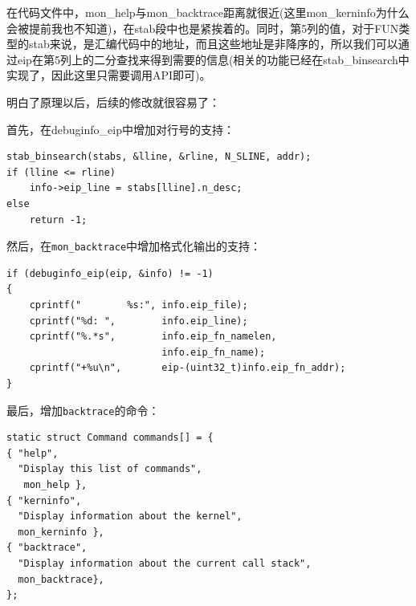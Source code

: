 在代码文件中，mon\_help与mon\_backtrace距离就很近(这里mon\_kerninfo为什么会被提前我也不知道)，在stab段中也是紧挨着的。同时，第5列的值，对于FUN类型的stab来说，是汇编代码中的地址，而且这些地址是非降序的，所以我们可以通过eip在第5列上的二分查找来得到需要的信息(相关的功能已经在stab\_binsearch中实现了，因此这里只需要调用API即可)。

明白了原理以后，后续的修改就很容易了：

首先，在debuginfo\_eip中增加对行号的支持：\\
\begin{lstlisting}
stab_binsearch(stabs, &lline, &rline, N_SLINE, addr);
if (lline <= rline)
    info->eip_line = stabs[lline].n_desc;
else
    return -1;
\end{lstlisting}

然后，在\lstinline{mon_backtrace}中增加格式化输出的支持：\\
\begin{lstlisting}
if (debuginfo_eip(eip, &info) != -1)
{
    cprintf("        %s:", info.eip_file);
    cprintf("%d: ",        info.eip_line);
    cprintf("%.*s",        info.eip_fn_namelen, 
                           info.eip_fn_name);
    cprintf("+%u\n",       eip-(uint32_t)info.eip_fn_addr);
}
\end{lstlisting}

最后，增加\lstinline{backtrace}的命令：\\[1cm]
\begin{lstlisting}
static struct Command commands[] = {
{ "help", 
  "Display this list of commands", 
   mon_help },
{ "kerninfo", 
  "Display information about the kernel", 
  mon_kerninfo },
{ "backtrace", 
  "Display information about the current call stack", 
  mon_backtrace},
};
\end{lstlisting}